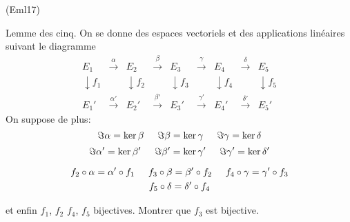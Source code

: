 \begin{tiny}(Eml17)\end{tiny} Lemme des cinq.\newline
On se donne des espaces vectoriels et des applications linéaires suivant le diagramme
\begin{displaymath}
  \begin{array}{lllllllll}
    E_1 & \xrightarrow{\alpha}  & E_2  & \xrightarrow{\beta}  & E_3 & \xrightarrow{\gamma}   & E_4  & \xrightarrow{\delta}  & E_5 \\ 
\downarrow f_1&     &\downarrow  f_2  &             &\downarrow f_3 &               &\downarrow f_4 &                    &\downarrow f_5  \\
    E_1' & \xrightarrow{\alpha'} & E_2' & \xrightarrow{\beta'} & E_3' & \xrightarrow{\gamma'} & E_4' & \xrightarrow{\delta'} & E_5' 
  \end{array}
\end{displaymath}
On suppose de plus: 
\begin{displaymath}
\Im \alpha = \ker \beta\hspace{0.5cm}  \Im \beta = \ker \gamma \hspace{0.5cm} \Im \gamma = \ker \delta  
\end{displaymath}
\begin{displaymath}
\Im \alpha' = \ker \beta' \hspace{0.5cm}\Im \beta' = \ker \gamma' \hspace{0.5cm}\Im \gamma' = \ker \delta'  
\end{displaymath}

\begin{multline*}
f_2 \circ \alpha = \alpha' \circ f_1 \hspace{0.5cm}
f_3 \circ \beta = \beta' \circ f_2 \hspace{0.5cm}
f_4 \circ \gamma = \gamma' \circ f_3 \\
f_5 \circ \delta = \delta' \circ f_4
\end{multline*}

et enfin $f_1$, $f_2$ $f_4$, $f_5$ bijectives.\newline
Montrer que $f_3$ est bijective.
